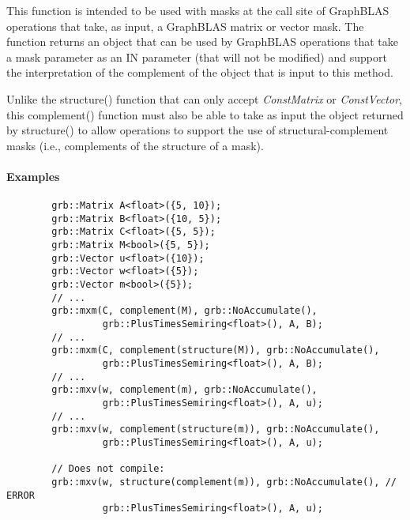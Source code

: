This function is intended to be used with masks at the call site of GraphBLAS 
operations that take, as input, a GraphBLAS matrix or vector mask.  The function 
returns an object that can be used by GraphBLAS operations that take a mask 
parameter as an {\sf IN} parameter (that will not be modified) and support the 
interpretation of the complement of the object that is input to this method.

Unlike the {\sf structure()} function that can only accept \emph{ConstMatrix} or 
\emph{ConstVector}, this {\sf complement()} function must also be able to take as
input the object returned by {\sf structure()} to allow operations to support the
use of structural-complement masks (i.e., complements of the structure of a mask).

\paragraph{Examples}

\begin{verbatim}
        grb::Matrix A<float>({5, 10});
        grb::Matrix B<float>({10, 5});
        grb::Matrix C<float>({5, 5});
        grb::Matrix M<bool>({5, 5});
        grb::Vector u<float>({10});
        grb::Vector w<float>({5});
        grb::Vector m<bool>({5});
        // ...
        grb::mxm(C, complement(M), grb::NoAccumulate(), 
                 grb::PlusTimesSemiring<float>(), A, B);
        // ...
        grb::mxm(C, complement(structure(M)), grb::NoAccumulate(), 
                 grb::PlusTimesSemiring<float>(), A, B);
        // ...
        grb::mxv(w, complement(m), grb::NoAccumulate(), 
                 grb::PlusTimesSemiring<float>(), A, u);
        // ...
        grb::mxv(w, complement(structure(m)), grb::NoAccumulate(), 
                 grb::PlusTimesSemiring<float>(), A, u);

        // Does not compile:
        grb::mxv(w, structure(complement(m)), grb::NoAccumulate(), // ERROR
                 grb::PlusTimesSemiring<float>(), A, u);
\end{verbatim}
